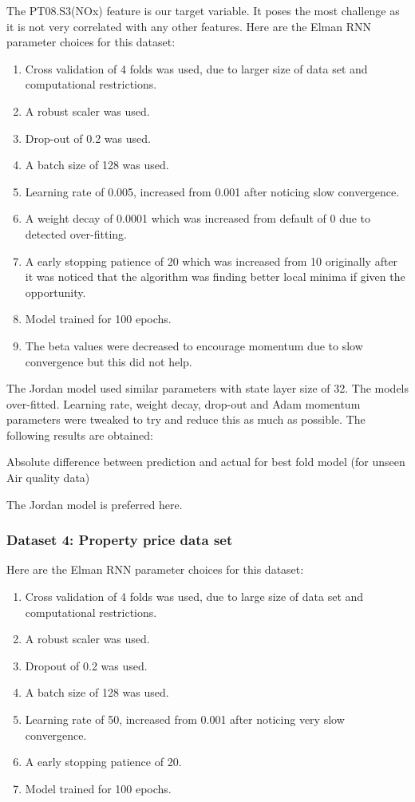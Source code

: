 \documentclass[conference]{IEEEtran}
\begin{document}
The PT08.S3(NOx) feature is our target variable. It poses the most challenge as it is not very correlated with any other features. Here are the Elman RNN parameter choices for this dataset:

\begin{enumerate}[]
	\item Cross validation of 4 folds was used, due to larger size of data set and computational restrictions.
	\item A robust scaler was used.
	\item Drop-out of 0.2 was used.
	\item A batch size of 128 was used.
	\item Learning rate of 0.005, increased from 0.001 after noticing slow convergence.
	\item A weight decay of 0.0001 which was increased from default of 0 due to detected over-fitting.
	\item A early stopping patience of 20 which was increased from 10 originally after it was noticed that the algorithm was finding better local minima if given the opportunity.
	\item Model trained for 100 epochs.
	\item The beta values were decreased to encourage momentum due to slow convergence but this did not help.
\end{enumerate}

The Jordan model used similar parameters with state layer size of 32. The models over-fitted. Learning rate, weight decay, drop-out and Adam momentum parameters were tweaked to try and reduce this as much as possible. The following results are obtained:

\begin{table}[H]
	\caption{Absolute difference between prediction and actual for best fold model (for unseen Air quality data)}
	\label{tab:weather-rnn-summary}
\end{table}

The Jordan model is preferred here.

\subsubsection{Dataset 4: Property price data set}

Here are the Elman RNN parameter choices for this dataset:

\begin{enumerate}[]
	\item Cross validation of 4 folds was used, due to large size of data set and computational restrictions.
	\item A robust scaler was used.
	\item Dropout of 0.2 was used.
	\item A batch size of 128 was used.
	\item Learning rate of 50, increased from 0.001 after noticing very slow convergence.
	\item A early stopping patience of 20.
	\item Model trained for 100 epochs.
\end{enumerate}
\end{document}
